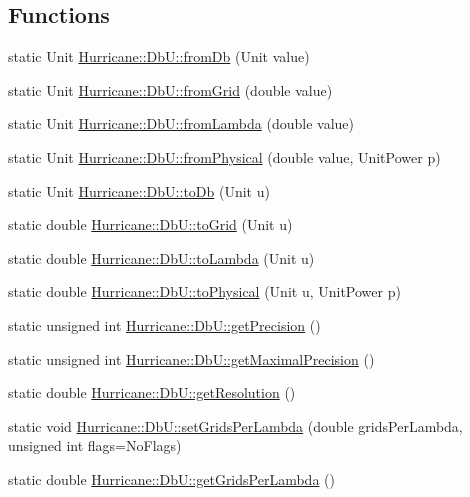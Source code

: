 \subsection*{Functions}
\begin{DoxyCompactItemize}
\item 
static Unit \hyperlink{group__DbUGroup_gaec69d65ec1651c2feea24c5931f4580b}{Hurricane\-::\-Db\-U\-::from\-Db} (Unit value)
\item 
static Unit \hyperlink{group__DbUGroup_ga367e1d1b5ac1df076745550cba8a83c1}{Hurricane\-::\-Db\-U\-::from\-Grid} (double value)
\item 
static Unit \hyperlink{group__DbUGroup_ga4b570755b19ea9ff0f2f258a221bd935}{Hurricane\-::\-Db\-U\-::from\-Lambda} (double value)
\item 
static Unit \hyperlink{group__DbUGroup_ga11d4dbd9134a19bda35cbacde1cb2769}{Hurricane\-::\-Db\-U\-::from\-Physical} (double value, Unit\-Power p)
\item 
static Unit \hyperlink{group__DbUGroup_gaec07c6e7ae2a2a6f54e2a16b32c8bf26}{Hurricane\-::\-Db\-U\-::to\-Db} (Unit u)
\item 
static double \hyperlink{group__DbUGroup_ga318d673386c9424e07c12efd598c730d}{Hurricane\-::\-Db\-U\-::to\-Grid} (Unit u)
\item 
static double \hyperlink{group__DbUGroup_ga4923a9a443871282ad7d331be2a2a5d4}{Hurricane\-::\-Db\-U\-::to\-Lambda} (Unit u)
\item 
static double \hyperlink{group__DbUGroup_gab901e9d5c12e878728178f113def6c45}{Hurricane\-::\-Db\-U\-::to\-Physical} (Unit u, Unit\-Power p)
\item 
static unsigned int \hyperlink{group__DbUGroup_ga6169efbdd9b3d54a0bd8467c8f957fda}{Hurricane\-::\-Db\-U\-::get\-Precision} ()
\item 
static unsigned int \hyperlink{group__DbUGroup_ga8756c9f0a32af5f601cd150e73b02c03}{Hurricane\-::\-Db\-U\-::get\-Maximal\-Precision} ()
\item 
static double \hyperlink{group__DbUGroup_ga120a60b09b344d01c583567a1e489d9e}{Hurricane\-::\-Db\-U\-::get\-Resolution} ()
\item 
static void \hyperlink{group__DbUGroup_gac93f9ba2a09105227e34bd05bcb1500c}{Hurricane\-::\-Db\-U\-::set\-Grids\-Per\-Lambda} (double grids\-Per\-Lambda, unsigned int flags=No\-Flags)
\item 
static double \hyperlink{group__DbUGroup_ga9a0359adbfafc356326f5c6adf57ff04}{Hurricane\-::\-Db\-U\-::get\-Grids\-Per\-Lambda} ()
\item 

\end{DoxyCompactItemize}
